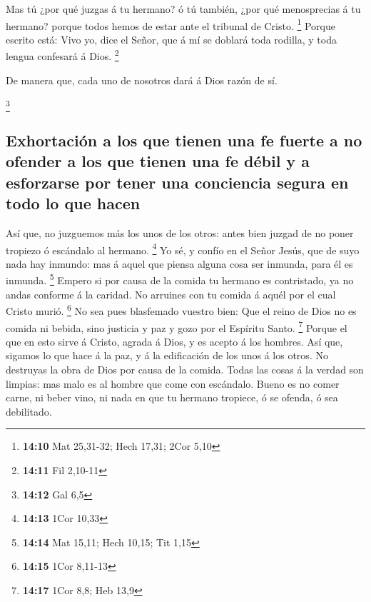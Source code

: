  Mas tú ¿por qué juzgas á tu hermano? ó tú también, ¿por
qué menosprecias á tu hermano? porque todos hemos de estar ante el
tribunal de Cristo. \footnote{\textbf{14:10} Mat 25,31-32; Hech 17,31;
  2Cor 5,10}  Porque escrito está: Vivo yo, dice el Señor,
que á mí se doblará toda rodilla, y toda lengua confesará á Dios.
\footnote{\textbf{14:11} Fil 2,10-11}

 De manera que, cada uno de nosotros dará á Dios razón de
sí.

\footnote{\textbf{14:12} Gal 6,5}

\hypertarget{exhortaciuxf3n-a-los-que-tienen-una-fe-fuerte-a-no-ofender-a-los-que-tienen-una-fe-duxe9bil-y-a-esforzarse-por-tener-una-conciencia-segura-en-todo-lo-que-hacen}{%
\subsection{Exhortación a los que tienen una fe fuerte a no ofender a
los que tienen una fe débil y a esforzarse por tener una conciencia
segura en todo lo que
hacen}\label{exhortaciuxf3n-a-los-que-tienen-una-fe-fuerte-a-no-ofender-a-los-que-tienen-una-fe-duxe9bil-y-a-esforzarse-por-tener-una-conciencia-segura-en-todo-lo-que-hacen}}

 Así que, no juzguemos más los unos de los otros: antes
bien juzgad de no poner tropiezo ó escándalo al hermano. \footnote{\textbf{14:13}
  1Cor 10,33}  Yo sé, y confío en el Señor Jesús, que de
suyo nada hay inmundo: mas á aquel que piensa alguna cosa ser inmunda,
para él es inmunda. \footnote{\textbf{14:14} Mat 15,11; Hech 10,15; Tit
  1,15}  Empero si por causa de la comida tu hermano es
contristado, ya no andas conforme á la caridad. No arruines con tu
comida á aquél por el cual Cristo murió. \footnote{\textbf{14:15} 1Cor
  8,11-13}  No sea pues blasfemado vuestro bien:
 Que el reino de Dios no es comida ni bebida, sino justicia
y paz y gozo por el Espíritu Santo. \footnote{\textbf{14:17} 1Cor 8,8;
  Heb 13,9}  Porque el que en esto sirve á Cristo, agrada á
Dios, y es acepto á los hombres.  Así que, sigamos lo que
hace á la paz, y á la edificación de los unos á los otros. 
No destruyas la obra de Dios por causa de la comida. Todas las cosas á
la verdad son limpias: mas malo es al hombre que come con escándalo.
 Bueno es no comer carne, ni beber vino, ni nada en que tu
hermano tropiece, ó se ofenda, ó sea debilitado.


